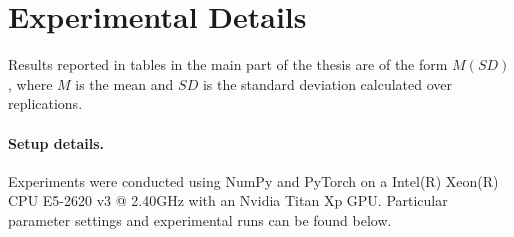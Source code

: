 \section{Experimental Details}
 Results reported in tables in the main part of the thesis are of the form $M\scriptscriptstyle{(SD)}$, where $M$ is the mean and $SD$ is the standard deviation calculated over replications.

\paragraph{Setup details.} Experiments were conducted using NumPy and PyTorch on a Intel(R) Xeon(R) CPU E5-2620 v3 @ 2.40GHz with an Nvidia Titan Xp GPU. Particular parameter settings and experimental runs can be found below.

